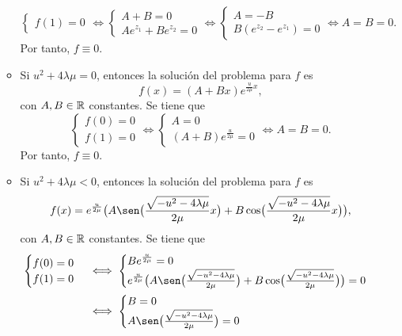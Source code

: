 \documentclass[11pt]{report}
\begin{document}
\begin{solution}
\begin{enumerate}
\begin{itemize}
\[\begin{cases}
                f(1)=0
            \end{cases} \iff \begin{cases}
                A+B=0 \\
                Ae^{z_1}+Be^{z_2}=0
            \end{cases} \iff \begin{cases}
                A=-B \\
                B(e^{z_2}-e^{z_1})=0
            \end{cases} \iff A = B = 0.\]
            Por tanto, $f \equiv 0$.
            \item Si $u^2+4\lambda\mu = 0$, entonces la solución del problema para $f$ es
            \[f(x) = (A+Bx)e^{\frac{u}{2\mu}x},\]
            con $A,B\in\mathbb R$ constantes. Se tiene que
            \[\begin{cases}
                f(0)=0\\
                f(1)=0
            \end{cases} \iff \begin{cases}
                A = 0 \\
                (A+B)e^{\frac{u}{2\mu}} = 0
            \end{cases} \iff A = B = 0.\]
            Por tanto, $f \equiv 0$.
            \item Si $u^2+4\lambda\mu < 0$, entonces la solución del problema para $f$ es
            \[f(x) = e^{\frac{u}{2\mu}}\bigl(A\sen\bigl(\frac{\sqrt{-u^2-4\lambda \mu}}{2\mu}x\bigr)+B\cos\bigl(\frac{\sqrt{-u^2-4\lambda \mu}}{2\mu}x\bigr)\bigr),\]
            con $A,B\in\mathbb R$ constantes. Se tiene que
            \begin{align*}
                \begin{cases}
                    f(0)=0\\
                    f(1)=0
                \end{cases} &\iff \begin{cases}
                    Be^{\frac{u}{2\mu}} = 0 \\
                    e^{\frac{u}{2\mu}}\bigl(A\sen\bigl(\frac{\sqrt{-u^2-4\lambda \mu}}{2\mu}\bigr)+B\cos\bigl(\frac{\sqrt{-u^2-4\lambda \mu}}{2\mu}\bigr)\bigr) = 0
                \end{cases}
                \\
                &\iff \begin{cases}
                    B = 0 \\
                    A\sen\bigl(\frac{\sqrt{-u^2-4\lambda\mu}}{2\mu}\bigr) = 0

\end{cases}
\end{align*}
\end{itemize}
\end{enumerate}
\end{solution}
\end{document}
